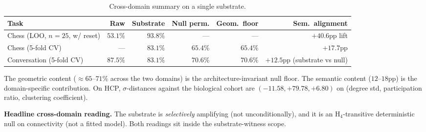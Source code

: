 \begin{table}[ht]
\centering
\small
\caption{Cross-domain summary on a single substrate.}
\label{tab:cross_domain_summary}
\begin{tabular}{l r r r r r}
\toprule
Task & Raw & Substrate & Null perm. & Geom.\ floor & Sem.\ alignment \\
\midrule
Chess (LOO, $n=25$, w/ reset) & $53.1\%$ & $93.8\%$ & --- & --- & $+40.6$pp lift \\
Chess (5-fold CV)             & ---      & $83.1\%$ & $65.4\%$ & $65.4\%$ & $+17.7$pp \\
Conversation (5-fold CV)      & $87.5\%$ & $83.1\%$ & $70.6\%$ & $70.6\%$ & $+12.5$pp (substrate vs null) \\
\bottomrule
\end{tabular}
\end{table}

The geometric content ($\approx 65$--$71\%$ across the two domains)
is the architecture-invariant null floor. The semantic content
($12$--$18$pp) is the domain-specific contribution. On HCP,
$\sigma$-distances against the biological cohort are
$(-11.58, +79.78, +6.80)$ on (degree std, participation ratio,
clustering coefficient).

\textbf{Headline cross-domain reading.} The substrate is
\emph{selectively} amplifying (not unconditionally), and it is an
H$_4$-transitive deterministic null on connectivity (not a fitted
model). Both readings sit inside the substrate-witness scope.
